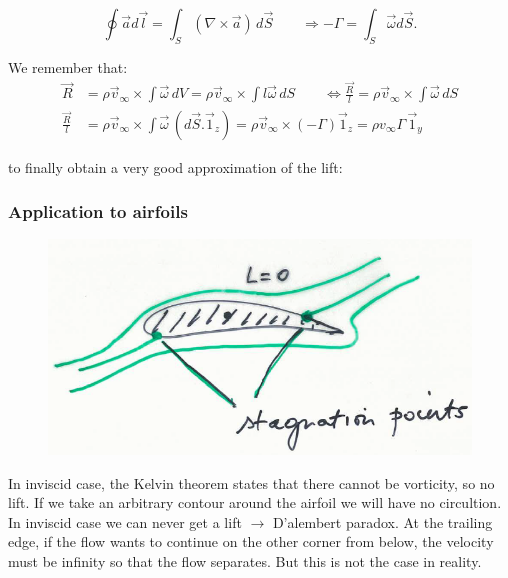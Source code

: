 		\begin{equation}
			\oint \vec{a} d\vec{l} = \int _S (\nabla \times \vec{a})\, d\vec{S} \qquad \Rightarrow -\Gamma = \int _S \vec{\omega} d\vec{S}.
		\end{equation}
		
		We remember that:
		\begin{equation}
		\begin{aligned}
		\vec{R} &= \rho \vec{v}_\infty \times \int  \vec{\omega}\, dV = \rho \vec{v}_\infty \times \int  l\vec{\omega}\, dS \qquad \Leftrightarrow \frac{\vec{R}}{l} = \rho \vec{v}_\infty \times \int  \vec{\omega}\, dS \\
		\frac{\vec{R}}{l}&= \rho \vec{v}_\infty \times \int  \vec{\omega}\, (d\vec{S}.\vec{1}_z) = \rho \vec{v}_\infty \times (-\Gamma)\vec{1}_z = \rho v_\infty \Gamma \,\vec{1}_y
		\end{aligned}
		\end{equation}
		
		to finally obtain a very good approximation of the lift:
		
		\begin{center}
		\end{center}
		
	\subsubsection{Application to airfoils}
		\begin{figure}
		\vspace{-5mm}
		\includegraphics[scale=0.35]{ch1/3}
		\end{figure}
		In inviscid case, the Kelvin theorem states that there cannot be vorticity, so no lift. If we take an arbitrary contour around the airfoil we will have no circultion. In inviscid case we can never get a lift $\rightarrow$ D’alembert paradox. At the trailing edge, if the flow wants to continue on the other corner from below, the velocity must be infinity so that the flow separates. But this is not the case in reality. \\


